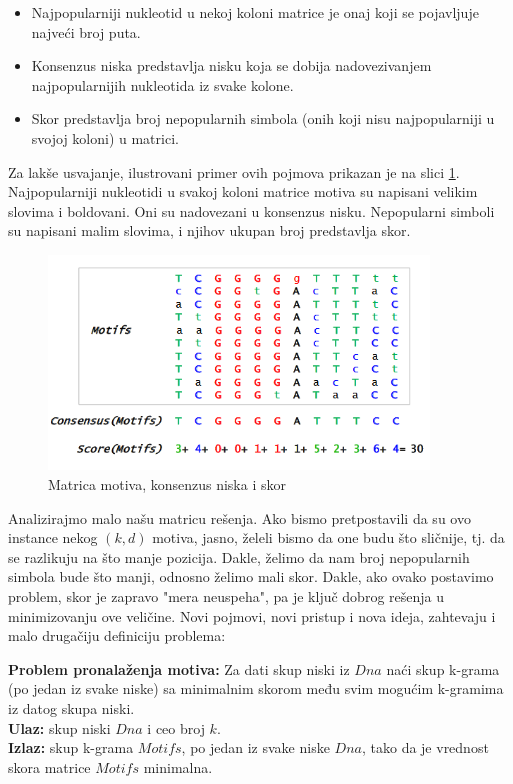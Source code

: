\begin{itemize}
    \item Najpopularniji nukleotid u nekoj koloni matrice je onaj koji se pojavljuje najveći broj puta.
    \item Konsenzus niska predstavlja nisku koja se dobija nadovezivanjem najpopularnijih nukleotida iz svake kolone.
    \item Skor predstavlja broj nepopularnih simbola (onih koji nisu najpopularniji u svojoj koloni) u matrici.
\end{itemize}

Za lakše usvajanje, ilustrovani primer ovih pojmova prikazan je na slici \ref{slika: motivi skor}. Najpopularniji nukleotidi u svakoj koloni matrice motiva su napisani velikim slovima i boldovani. Oni su nadovezani u konsenzus nisku. Nepopularni simboli su napisani malim slovima, i njihov ukupan broj predstavlja skor.


\begin{figure}[h]
\centering
\includegraphics[width=0.9\textwidth]{poglavlja/2/slike/30.PNG}
\caption{Matrica motiva, konsenzus niska i skor}
\label{slika: motivi skor}
\end{figure}

Analizirajmo malo našu matricu rešenja. Ako bismo pretpostavili da su ovo instance nekog $(k,d)$ motiva, jasno, želeli bismo da one budu što sličnije, tj. da se razlikuju na što manje pozicija. Dakle, želimo da nam broj nepopularnih simbola bude što manji, odnosno želimo mali skor. Dakle, ako ovako postavimo problem, skor je zapravo "mera neuspeha", pa je ključ dobrog rešenja u minimizovanju ove veličine. Novi pojmovi, novi pristup i nova ideja, zahtevaju i malo drugačiju definiciju problema:

\begin{tcolorbox}
\textbf{Problem pronalaženja motiva:} Za dati skup niski iz $Dna$ naći skup k-grama (po jedan iz svake niske) sa minimalnim skorom među svim mogućim k-gramima iz datog skupa niski.\\
\textbf{Ulaz:} skup niski $Dna$ i ceo broj $k$.\\
\textbf{Izlaz:} skup k-grama $Motifs$, po jedan iz svake niske $Dna$, tako da je vrednost skora matrice $Motifs$ minimalna.
\end{tcolorbox}

